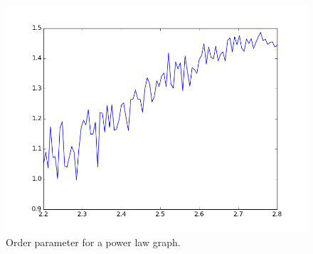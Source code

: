 \documentclass[twocolumn,prl,superscriptaddress]{revtex4}
\begin{document}
\begin{figure}
\begin{center}
\includegraphics[width=\columnwidth]{power_plot.png}
\end{center}
\caption{Order parameter for a power law graph.}
\label{fig:power-law}
\end{figure}


\end{document}
